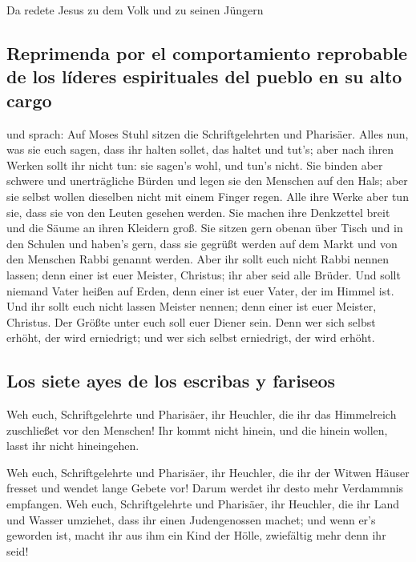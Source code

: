  Da redete Jesus zu dem Volk und zu seinen Jüngern

\hypertarget{reprimenda-por-el-comportamiento-reprobable-de-los-luxedderes-espirituales-del-pueblo-en-su-alto-cargo}{%
\subsection{Reprimenda por el comportamiento reprobable de los líderes
espirituales del pueblo en su alto
cargo}\label{reprimenda-por-el-comportamiento-reprobable-de-los-luxedderes-espirituales-del-pueblo-en-su-alto-cargo}}

 und sprach: Auf Moses Stuhl sitzen die Schriftgelehrten
und Pharisäer.  Alles nun, was sie euch sagen, dass ihr
halten sollet, das haltet und tut's; aber nach ihren Werken sollt ihr
nicht tun: sie sagen's wohl, und tun's nicht.  Sie binden
aber schwere und unerträgliche Bürden und legen sie den Menschen auf den
Hals; aber sie selbst wollen dieselben nicht mit einem Finger regen.
 Alle ihre Werke aber tun sie, dass sie von den Leuten
gesehen werden. Sie machen ihre Denkzettel breit und die Säume an ihren
Kleidern groß.  Sie sitzen gern obenan über Tisch und in
den Schulen  und haben's gern, dass sie gegrüßt werden auf
dem Markt und von den Menschen Rabbi genannt werden.  Aber
ihr sollt euch nicht Rabbi nennen lassen; denn einer ist euer Meister,
Christus; ihr aber seid alle Brüder.  Und sollt niemand
Vater heißen auf Erden, denn einer ist euer Vater, der im Himmel ist.
 Und ihr sollt euch nicht lassen Meister nennen; denn
einer ist euer Meister, Christus.  Der Größte unter euch
soll euer Diener sein.  Denn wer sich selbst erhöht, der
wird erniedrigt; und wer sich selbst erniedrigt, der wird erhöht.

\hypertarget{los-siete-ayes-de-los-escribas-y-fariseos}{%
\subsection{Los siete ayes de los escribas y
fariseos}\label{los-siete-ayes-de-los-escribas-y-fariseos}}

 Weh euch, Schriftgelehrte und Pharisäer, ihr Heuchler,
die ihr das Himmelreich zuschließet vor den Menschen! Ihr kommt nicht
hinein, und die hinein wollen, lasst ihr nicht hineingehen.

 Weh euch, Schriftgelehrte und Pharisäer, ihr Heuchler,
die ihr der Witwen Häuser fresset und wendet lange Gebete vor! Darum
werdet ihr desto mehr Verdammnis empfangen.  Weh euch,
Schriftgelehrte und Pharisäer, ihr Heuchler, die ihr Land und Wasser
umziehet, dass ihr einen Judengenossen machet; und wenn er's geworden
ist, macht ihr aus ihm ein Kind der Hölle, zwiefältig mehr denn ihr
seid!


